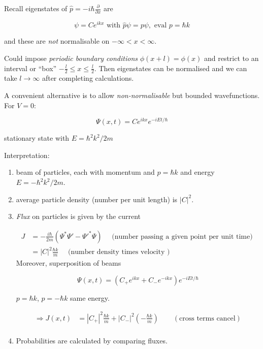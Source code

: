 \documentclass[a4paper]{article}
\begin{document}
Recall eigenstates of $ \hat{p} = - i \hbar \frac{\partial }{\partial x} $ are 

\[ \psi = C e^{i k x} \text{ with } \hat{p} \psi = p \psi, \text{ eval } p = \hbar k \]

and these are \emph{not} normalisable on $ - \infty < x < \infty $.

Could impose \emph{periodic boundary conditions} $ \phi(x + l) = \phi(x) $ and restrict to an interval or ``box'' $ - \frac{l}{2} \leq x \leq \frac{l}{2} $. Then eigenstates can be normalised and we can take $ l \to \infty $ after completing calculations.

A convenient alternative is to allow \emph{non-normalisable} but bounded wavefunctions. For $ V = 0 $:

\[ \Psi(x,t) = C e^{ikx} e^{-iEt/\hbar} \]

stationary state with $ E = \hbar^{2} k^{2} / 2m $

Interpretation:

\begin{enumerate}
	\item beam of particles, each with momentum and $ p = \hbar k $ and energy $ E = - \hbar^{2} k^{2} / 2m $.
	\item average particle density (number per unit length) is $ | C |^{2} $.
	\item \emph{Flux} on particles is given by the current 
	
	\begin{align*}
	J & = - \frac{i \hbar}{2m}  (  \Psi^{*} \Psi' - \Psi'^{*} \Psi ) \quad \text{ (number passing a given point per unit time) } \\
	& = | C |^{2}  \frac{\hbar k}{m}  \quad \text{ (number density times velocity ) } \end{align*}
	Moreover, superposition of beams 
	
	\[ \Psi(x,t) = (  C_{+} e^{ikx}   + C_{-}  e^{-ikx}   ) e^{-iEt/\hbar}  \]
	
	$ p = \hbar k $, $ p = -\hbar k $ same energy.
	
	\begin{align*}
	\Rightarrow J(x,t) & = | C_{+} |^{2} \frac{\hbar k}{m} + | C_{-} |^{2}  \left(  - \frac{\hbar k}{m} \right) \qquad (\text{cross terms cancel})   \\
	\end{align*}
	
	\item Probabilities are calculated by comparing fluxes.
	
\end{enumerate}
\end{document}
